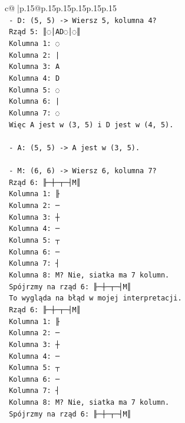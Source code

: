 \documentclass{article}
\begin{document}
{\begin{supertabular}{c@{$\;$}|p{.15\linewidth}@{}p{.15\linewidth}p{.15\linewidth}p{.15\linewidth}p{.15\linewidth}p{.15\linewidth}}
{{{\\ 
\texttt{  {-} D: (5, 5) {-}> Wiersz 5, kolumna 4?} \\
\texttt{    Rząd 5: ║◌│AD◌│◌║} \\
\texttt{    Kolumna 1: ◌} \\
\texttt{    Kolumna 2: |} \\
\texttt{    Kolumna 3: A} \\
\texttt{    Kolumna 4: D} \\
\texttt{    Kolumna 5: ◌} \\
\texttt{    Kolumna 6: |} \\
\texttt{    Kolumna 7: ◌} \\
\texttt{    Więc A jest w (3, 5) i D jest w (4, 5).} \\
\\ 
\texttt{  {-} A: (5, 5) {-}> A jest w (3, 5).} \\
\\ 
\texttt{  {-} M: (6, 6) {-}> Wiersz 6, kolumna 7?} \\
\texttt{    Rząd 6: ╟─┼─┬─┤M║} \\
\texttt{    Kolumna 1: ╟} \\
\texttt{    Kolumna 2: ─} \\
\texttt{    Kolumna 3: ┼} \\
\texttt{    Kolumna 4: ─} \\
\texttt{    Kolumna 5: ┬} \\
\texttt{    Kolumna 6: ─} \\
\texttt{    Kolumna 7: ┤} \\
\texttt{    Kolumna 8: M? Nie, siatka ma 7 kolumn.} \\
\texttt{    Spójrzmy na rząd 6: ╟─┼─┬─┤M║} \\
\texttt{    To wygląda na błąd w mojej interpretacji.} \\
\texttt{    Rząd 6: ╟─┼─┬─┤M║} \\
\texttt{    Kolumna 1: ╟} \\
\texttt{    Kolumna 2: ─} \\
\texttt{    Kolumna 3: ┼} \\
\texttt{    Kolumna 4: ─} \\
\texttt{    Kolumna 5: ┬} \\
\texttt{    Kolumna 6: ─} \\
\texttt{    Kolumna 7: ┤} \\
\texttt{    Kolumna 8: M? Nie, siatka ma 7 kolumn.} \\
\texttt{    Spójrzmy na rząd 6: ╟─┼─┬─┤M║} \\
}}}
\end{supertabular}}
\end{document}
